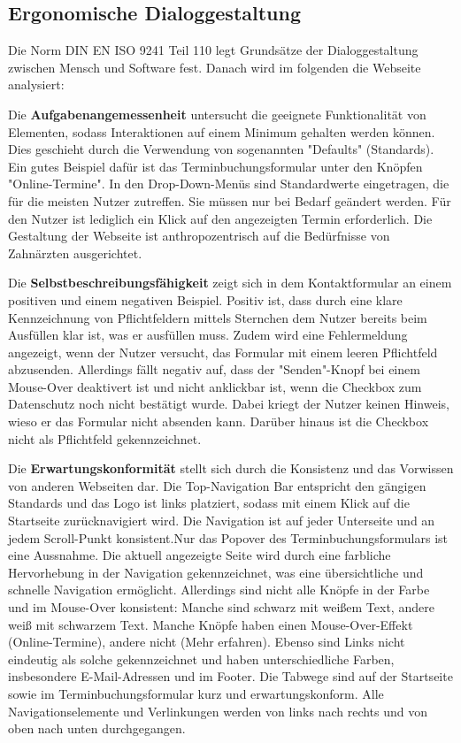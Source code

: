 \subsection{Ergonomische Dialoggestaltung} \label{sec:dialoggestaltung}

Die Norm DIN EN ISO 9241 Teil 110 legt Grundsätze der Dialoggestaltung zwischen Mensch und Software fest. Danach wird im folgenden die Webseite analysiert:

Die \textbf{Aufgabenangemessenheit} untersucht die geeignete Funktionalität von Elementen, sodass Interaktionen auf einem Minimum gehalten werden können. Dies geschieht durch die Verwendung von sogenannten "Defaults" (Standards). Ein gutes Beispiel dafür ist das Terminbuchungsformular unter den Knöpfen "Online-Termine". In den Drop-Down-Menüs sind Standardwerte eingetragen, die für die meisten Nutzer zutreffen. Sie müssen nur bei Bedarf geändert werden. Für den Nutzer ist lediglich ein Klick auf den angezeigten Termin erforderlich. Die Gestaltung der Webseite ist anthropozentrisch auf die Bedürfnisse von Zahnärzten ausgerichtet.

Die \textbf{Selbstbeschreibungsfähigkeit} zeigt sich in dem Kontaktformular an einem positiven und einem negativen Beispiel. Positiv ist, dass durch eine klare Kennzeichnung von Pflichtfeldern mittels Sternchen dem Nutzer bereits beim Ausfüllen klar ist, was er ausfüllen muss. Zudem wird eine Fehlermeldung angezeigt, wenn der Nutzer versucht, das Formular mit einem leeren Pflichtfeld abzusenden. Allerdings fällt negativ auf, dass der "Senden"-Knopf bei einem Mouse-Over deaktivert ist und nicht anklickbar ist, wenn die Checkbox zum Datenschutz noch nicht bestätigt wurde. Dabei kriegt der Nutzer keinen Hinweis, wieso er das Formular nicht absenden kann. Darüber hinaus ist die Checkbox nicht als Pflichtfeld gekennzeichnet.

Die \textbf{Erwartungskonformität} stellt sich durch die Konsistenz und das Vorwissen von anderen Webseiten dar. Die Top-Navigation Bar entspricht den gängigen Standards und das Logo ist links platziert, sodass mit einem Klick auf die Startseite zurücknavigiert wird. Die Navigation ist auf jeder Unterseite und an jedem Scroll-Punkt konsistent.Nur das Popover des Terminbuchungsformulars ist eine Aussnahme. Die aktuell angezeigte Seite wird durch eine farbliche Hervorhebung in der Navigation gekennzeichnet, was eine übersichtliche und schnelle Navigation ermöglicht. Allerdings sind nicht alle Knöpfe in der Farbe und im Mouse-Over konsistent: Manche sind schwarz mit weißem Text, andere weiß mit schwarzem Text. Manche Knöpfe haben einen Mouse-Over-Effekt (Online-Termine), andere nicht (Mehr erfahren). Ebenso sind Links nicht eindeutig als solche gekennzeichnet und haben unterschiedliche Farben, insbesondere E-Mail-Adressen und im Footer. Die Tabwege sind auf der Startseite sowie im Terminbuchungsformular kurz und erwartungskonform. Alle Navigationselemente und Verlinkungen werden von links nach rechts und von oben nach unten durchgegangen.